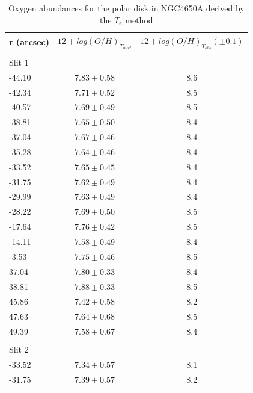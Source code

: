 \documentclass[12pt,preprint]{aastex}
\begin{document}
\begin{table}
\caption{Oxygen abundances for the polar disk in NGC4650A derived by the $T_e$ method}   %
\label{OHT}   %
\centering
\begin{tabular}{l c c}        %
\hline\hline                 %
r (arcsec) & $12+log(O/H)_{T_{mod}}$ & $12+log(O/H)_{T_{obs}} (\pm 0.1)$\\ %
\hline                        %
   &   &  \\
 Slit 1 & & \\
       -44.10   &    $7.83  \pm    0.58$ & 8.6\\
       -42.34   &    $7.71  \pm    0.52$ & 8.5\\
       -40.57   &    $7.69  \pm    0.49$ & 8.5\\
       -38.81   &    $7.65  \pm    0.50$ & 8.4\\
       -37.04   &    $7.67  \pm    0.46$ & 8.4\\
       -35.28   &    $7.64  \pm    0.46$ & 8.4\\
       -33.52   &    $7.65  \pm    0.45$ & 8.4\\
       -31.75   &    $7.62  \pm    0.49$ & 8.4\\
       -29.99   &    $7.63  \pm    0.49$ & 8.4\\
       -28.22   &    $7.69  \pm    0.50$ & 8.5\\
       -17.64   &    $7.76  \pm    0.42$ & 8.5\\
       -14.11   &    $7.58  \pm    0.49$ & 8.4\\
       -3.53   &    $7.75  \pm    0.46$ & 8.5\\
       37.04   &    $7.80  \pm    0.33$ & 8.4\\
       38.81   &    $7.88  \pm    0.33$ & 8.5\\
       45.86   &    $7.42  \pm    0.58$ & 8.2\\
       47.63   &    $7.64  \pm    0.68$ & 8.5\\
       49.39   &    $7.58  \pm    0.67$ & 8.4\\
  & &\\
 Slit 2 & &\\
       -33.52   &    $7.34  \pm    0.57$ & 8.1\\
       -31.75   &    $7.39  \pm    0.57$ & 8.2\\

\end{tabular}
\end{table}
\end{document}

